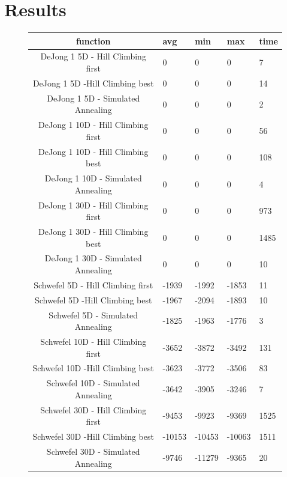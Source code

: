 \documentclass{report}
\begin{document}
\pagebreak

\section{Results}

\begin{figure}[!h]
\begin{tabular}{||c|||l|l||l||l||}
  \hline
  function & avg & min & max & time\\ \hline \hline
DeJong 1 5D - Hill Climbing first & 0 & 0 & 0 & 7 \\ \hline
DeJong 1 5D -Hill Climbing  best & 0 & 0 & 0 & 14 \\ \hline
DeJong 1 5D - Simulated Annealing  & 0 & 0 & 0 & 2 \\ \hline

DeJong 1 10D - Hill Climbing first & 0 & 0 & 0 & 56 \\ \hline
DeJong 1 10D - Hill Climbing best & 0 & 0 & 0 & 108 \\ \hline
DeJong 1 10D - Simulated Annealing & 0 & 0 & 0 & 4 \\ \hline

DeJong 1 30D - Hill Climbing first & 0 & 0 & 0 & 973 \\ \hline
DeJong 1 30D - Hill Climbing best & 0 & 0 & 0 & 1485 \\ \hline
DeJong 1 30D - Simulated Annealing & 0 & 0 & 0 & 10 \\ \hline

Schwefel 5D - Hill Climbing first & -1939 & -1992 & -1853 & 11 \\ \hline
Schwefel 5D -Hill Climbing  best & -1967 & -2094 & -1893 & 10 \\ \hline
Schwefel 5D - Simulated Annealing & -1825 & -1963 & -1776  & 3 \\ \hline

Schwefel 10D - Hill Climbing first & -3652 & -3872 & -3492 & 131 \\ \hline
Schwefel 10D -Hill Climbing  best & -3623 & -3772 & -3506 & 83 \\ \hline
Schwefel 10D - Simulated Annealing & -3642 & -3905 & -3246  & 7 \\ \hline

Schwefel 30D - Hill Climbing first & -9453 & -9923 & -9369 & 1525 \\ \hline
Schwefel 30D -Hill Climbing  best & -10153 & -10453 & -10063 & 1511 \\ \hline
Schwefel 30D - Simulated Annealing & -9746  & -11279 & -9365  & 20 \\ \hline


\end{tabular}
\end{figure}
\end{document}
